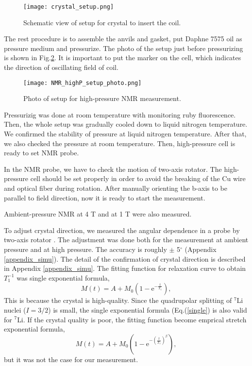 \begin{figure}
  \centering
  \texttt{[image: crystal\_setup.png]}
  \caption{Schematic view of setup for crystal to insert the coil.}
  \label{crystal_setup}
\end{figure}

The rest procedure is to assemble the anvils and gasket, put Daphne 7575 oil as pressure medium and pressurize.
The photo of the setup just before pressurizing is shown in Fig.\ref{NMR_highP_setup_photo}.
It is important to put the marker on the cell, which indicates the direction of oscillating field of coil.

\begin{figure}
  \centering
  \texttt{[image: NMR\_highP\_setup\_photo.png]}
  \caption{Photo of setup for high-pressure NMR measurement.}
  \label{NMR_highP_setup_photo}
\end{figure}

Pressurizig was done at room temperature with monitoring ruby fluorescence.
Then, the whole setup was gradually cooled down to liquid nitrogen temperature.
We confirmed the stability of pressure at liquid nitrogen temperature.
After that, we also checked the pressure at room temperature.
Then, high-pressure cell is ready to set NMR probe.

In the NMR probe, we have to check the motion of two-axis rotator.
The high-pressure cell should be set properly in order to avoid the breaking of the Cu wire and optical fiber during rotation.
After manually orienting the b-axis to be parallel to field direction, now it is ready to start the measurement.

Ambient-pressure NMR at 4 T and at 1 T were also measured.

To adjust crystal direction, we measured the angular dependence in a probe by two-axis rotator \cite{Kitagawa2010}.
The adjustment was done both for the measurement at ambient pressure and at high pressure.
The accuracy is roughly $\pm$ 5$^\circ$ (Appendix \ref{appendix_simu}).
The detail of the confirmation of crystal direction is described in Appendix \ref{appendix_simu}.
The fitting function for relaxation curve to obtain $T^{-1}_1$ was single exponential formula,
\begin{equation}
M (t) = A + M_0 (1 - \mathrm{e}^{-\frac{t}{T_1}}),
\label{single}
\end{equation}
This is because the crystal is high-quality.
Since the quadrupolar splitting of ${}^7$Li nuclei ($I = 3/2$) is small, the single exponential formula (Eq.(\ref{single}) is also valid for ${}^7$Li.
If the crystal quality is poor, the fitting function become emprical stretch exponential formula,
\begin{equation}
M (t) = A + M_0 (1 - \mathrm{e}^{-\left(\frac{t}{T_1}\right)^\beta}),
\end{equation}
but it was not the case for our measurement.
